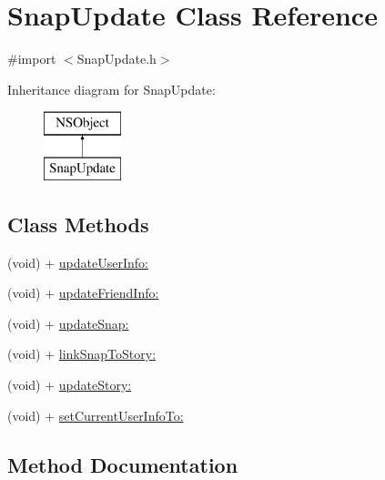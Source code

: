 \hypertarget{interface_snap_update}{}\section{Snap\+Update Class Reference}
\label{interface_snap_update}


{\ttfamily \#import $<$Snap\+Update.\+h$>$}

Inheritance diagram for Snap\+Update\+:\begin{figure}[H]
\begin{center}
\leavevmode
\includegraphics[height=2.000000cm]{interface_snap_update}
\end{center}
\end{figure}
\subsection*{Class Methods}
\begin{DoxyCompactItemize}
\item 
(void) + \hyperlink{interface_snap_update_a2f2313424326b8cca36b0377305fd558}{update\+User\+Info\+:}
\item 
(void) + \hyperlink{interface_snap_update_a15f506f1df1f82c909f0cadc7897668c}{update\+Friend\+Info\+:}
\item 
(void) + \hyperlink{interface_snap_update_a4b696d4d7360c744c7439fa56bf789d1}{update\+Snap\+:}
\item 
(void) + \hyperlink{interface_snap_update_ae62f7d46dcc21ccb30b5daf3df9ef4b2}{link\+Snap\+To\+Story\+:}
\item 
(void) + \hyperlink{interface_snap_update_a297dc954bce1692279760c0e586fc163}{update\+Story\+:}
\item 
(void) + \hyperlink{interface_snap_update_a5c2a912c3ec1437b83703220fc9552ac}{set\+Current\+User\+Info\+To\+:}
\end{DoxyCompactItemize}


\subsection{Method Documentation}
\hypertarget{interface_snap_update_ae62f7d46dcc21ccb30b5daf3df9ef4b2}{}\label{interface_snap_update_ae62f7d46dcc21ccb30b5daf3df9ef4b2} 
